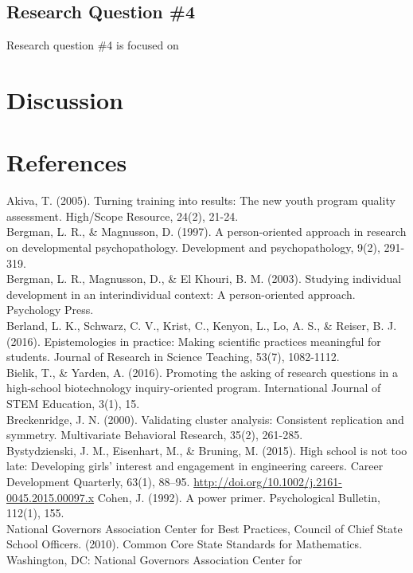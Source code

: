 \documentclass[]{msu-thesis}
\theoremstyle{definition}
\theoremstyle{definition}
\theoremstyle{definition}
\theoremstyle{remark}
\begin{document}
\section{Research Question \#4}\label{research-question-4}

Research question \#4 is focused on

\chapter{Discussion}\label{discussion}

\chapter{References}\label{references}

Akiva, T. (2005). Turning training into results: The new youth program
quality assessment. High/Scope Resource, 24(2), 21-24.\\
Bergman, L. R., \& Magnusson, D. (1997). A person-oriented approach in
research on developmental psychopathology. Development and
psychopathology, 9(2), 291-319.\\
Bergman, L. R., Magnusson, D., \& El Khouri, B. M. (2003). Studying
individual development in an interindividual context: A person-oriented
approach. Psychology Press.\\
Berland, L. K., Schwarz, C. V., Krist, C., Kenyon, L., Lo, A. S., \&
Reiser, B. J. (2016). Epistemologies in practice: Making scientific
practices meaningful for students. Journal of Research in Science
Teaching, 53(7), 1082-1112.\\
Bielik, T., \& Yarden, A. (2016). Promoting the asking of research
questions in a high-school biotechnology inquiry-oriented program.
International Journal of STEM Education, 3(1), 15.\\
Breckenridge, J. N. (2000). Validating cluster analysis: Consistent
replication and symmetry. Multivariate Behavioral Research, 35(2),
261-285.\\
Bystydzienski, J. M., Eisenhart, M., \& Bruning, M. (2015). High school
is not too late: Developing girls' interest and engagement in
engineering careers. Career Development Quarterly, 63(1), 88--95.
\url{http://doi.org/10.1002/j.2161-0045.2015.00097.x} Cohen, J. (1992).
A power primer. Psychological Bulletin, 112(1), 155.\\
National Governors Association Center for Best Practices, Council of
Chief State School Officers. (2010). Common Core State Standards for
Mathematics. Washington, DC: National Governors Association Center for
\end{document}
